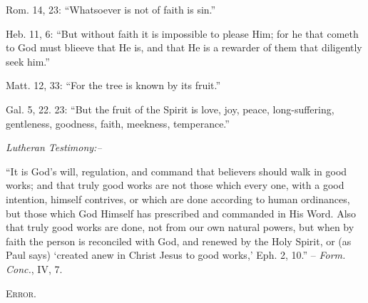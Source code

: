 \documentclass[
]{book}
\begin{document}
Rom. 14, 23: ``Whatsoever is not of faith is sin.''

Heb. 11, 6: ``But without faith it is impossible to please Him; for he that cometh to God must blieeve that He is, and that He is a rewarder of them that diligently seek him.''

Matt. 12, 33: ``For the tree is known by its fruit.''

Gal. 5, 22. 23: ``But the fruit of the Spirit is love, joy, peace, long-suffering, gentleness, goodness, faith, meekness, temperance.''

\begin{center}
\textsl{Lutheran Testimony:--}
\end{center}

``It is God's will, regulation, and command that believers should walk in good works; and that truly good works are not those which every one, with a good intention, himself contrives, or which are done according to human ordinances, but those which God Himself has prescribed and commanded in His Word. Also that truly good works are done, not from our own natural powers, but when by faith the person is reconciled with God, and renewed by the Holy Spirit, or (as Paul says) `created anew in Christ Jesus to good works,' Eph. 2, 10.'' -- \emph{Form. Conc.}, IV, 7.

\begin{center}
\textsc{Error.}
\end{center}
\end{document}
